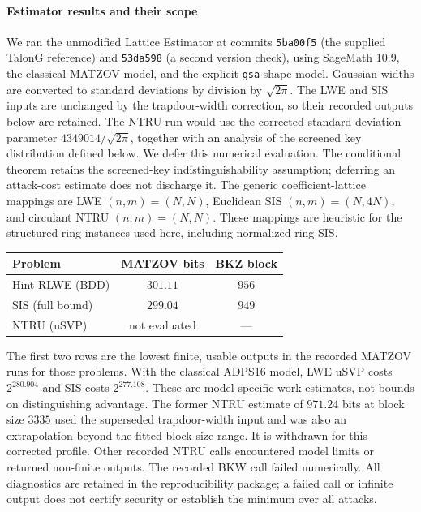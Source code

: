 \documentclass[lettersize,journal]{IEEEtran}
\begin{document}
\paragraph{Estimator results and their scope}
We ran the unmodified Lattice Estimator at commits
\texttt{5ba00f5} (the supplied TalonG reference) and
\texttt{53da598} (a second version check), using SageMath 10.9,
the classical MATZOV model, and the explicit \texttt{gsa} shape model.
Gaussian widths are converted to standard deviations by division by
$\sqrt{2\pi}$.
The LWE and SIS inputs are unchanged by the trapdoor-width
correction, so their recorded outputs below are retained. The NTRU run
would use the corrected standard-deviation parameter
$4349014/\sqrt{2\pi}$, together with an analysis of the screened key
distribution defined below. We defer this numerical evaluation. The
conditional theorem retains the screened-key indistinguishability
assumption; deferring an attack-cost estimate does not discharge it.
The generic coefficient-lattice mappings are
LWE $(n,m)=(N,N)$, Euclidean SIS $(n,m)=(N,4N)$, and circulant
NTRU $(n,m)=(N,N)$. These mappings are heuristic for the structured ring
instances used here, including normalized ring-SIS.
\begin{center}
\small
\begin{tabular}{lcc}
\hline
Problem & MATZOV bits & BKZ block\\
\hline
Hint-RLWE (BDD) & $301.11$ & $956$\\
SIS (full bound) & $299.04$ & $949$\\
NTRU (uSVP) & not evaluated & ---\\
\hline
\end{tabular}
\end{center}
The first two rows are the lowest finite, usable outputs in the recorded
MATZOV runs for those problems. With the classical ADPS16 model,
LWE uSVP costs $2^{280.904}$ and SIS costs $2^{277.108}$.
These are model-specific work estimates, not bounds on distinguishing
advantage.
The former NTRU estimate of $971.24$ bits at block size $3335$
used the superseded trapdoor-width input and was also an extrapolation
beyond the fitted block-size range. It is withdrawn for this corrected
profile. Other recorded NTRU calls encountered model limits or returned
non-finite outputs.
The recorded BKW call failed numerically. All diagnostics are retained in the
reproducibility package; a failed call or infinite output does not certify
security or establish the minimum over all attacks.
\end{document}
